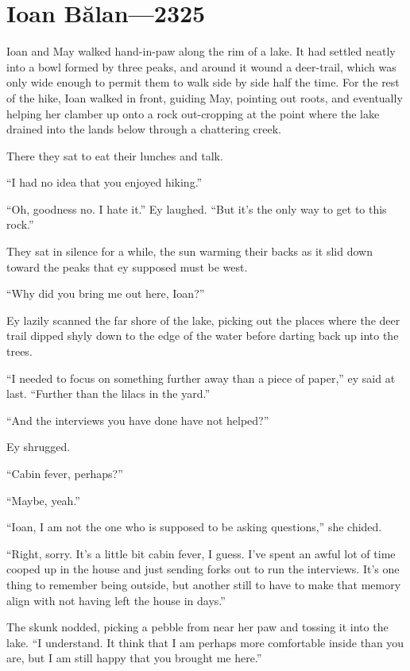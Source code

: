 \hypertarget{ioan-bux103lan-2325}{%
\chapter{Ioan Bălan—2325}\label{ioan-bux103lan-2325}}

Ioan and May walked hand-in-paw along the rim of a lake. It had settled neatly into a bowl formed by three peaks, and around it wound a deer-trail, which was only wide enough to permit them to walk side by side half the time. For the rest of the hike, Ioan walked in front, guiding May, pointing out roots, and eventually helping her clamber up onto a rock out-cropping at the point where the lake drained into the lands below through a chattering creek.

There they sat to eat their lunches and talk.

``I had no idea that you enjoyed hiking.''

``Oh, goodness no. I hate it.'' Ey laughed. ``But it's the only way to get to this rock.''

They sat in silence for a while, the sun warming their backs as it slid down toward the peaks that ey supposed must be west.

``Why did you bring me out here, Ioan?''

Ey lazily scanned the far shore of the lake, picking out the places where the deer trail dipped shyly down to the edge of the water before darting back up into the trees.

``I needed to focus on something further away than a piece of paper,'' ey said at last. ``Further than the lilacs in the yard.''

``And the interviews you have done have not helped?''

Ey shrugged.

``Cabin fever, perhaps?''

``Maybe, yeah.''

``Ioan, I am not the one who is supposed to be asking questions,'' she chided.

``Right, sorry. It's a little bit cabin fever, I guess. I've spent an awful lot of time cooped up in the house and just sending forks out to run the interviews. It's one thing to remember being outside, but another still to have to make that memory align with not having left the house in days.''

The skunk nodded, picking a pebble from near her paw and tossing it into the lake. ``I understand. It think that I am perhaps more comfortable inside than you are, but I am still happy that you brought me here.''


